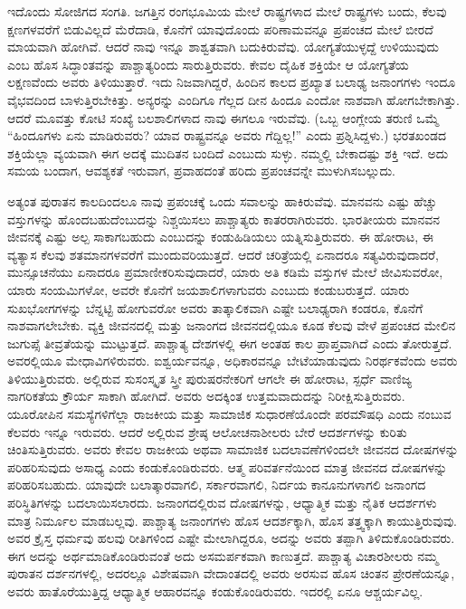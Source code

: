 ಇದೊಂದು ಸೋಜಿಗದ ಸಂಗತಿ. ಜಗತ್ತಿನ ರಂಗಭೂಮಿಯ ಮೇಲೆ ರಾಷ್ಟ್ರಗಳಾದ ಮೇಲೆ ರಾಷ್ಟ್ರಗಳು ಬಂದು, ಕೆಲವು ಕ್ಷಣಗಳವರೆಗೆ ಬಿಡುವಿಲ್ಲದೆ ಮೆರೆದಾಡಿ, ಕೊನೆಗೆ ಯಾವುದೊಂದು ಪರಿಣಾಮವನ್ನೂ ಪ್ರಪಂಚದ ಮೇಲೆ ಬೀರದೆ ಮಾಯವಾಗಿ ಹೋಗಿವೆ. ಆದರೆ ನಾವು ಇನ್ನೂ ಶಾಶ್ವತವಾಗಿ ಬದುಕಿರುವೆವು. ಯೋಗ್ಯತೆಯುಳ್ಳದ್ದೆ ಉಳಿಯುವುದು ಎಂಬ ಹೊಸ ಸಿದ್ಧಾಂತವನ್ನು ಪಾಶ್ಚಾತ್ಯರಿಂದು ಸಾರುತ್ತಿರುವರು. ಕೇವಲ ದೈಹಿಕ ಶಕ್ತಿಯೇ ಆ ಯೋಗ್ಯತೆಯ ಲಕ್ಷಣವೆಂದು ಅವರು ತಿಳಿಯುತ್ತಾರೆ. ಇದು ನಿಜವಾಗಿದ್ದರೆ, ಹಿಂದಿನ ಕಾಲದ ಪ್ರಖ್ಯಾತ ಬಲಾಢ್ಯ ಜನಾಂಗಗಳು ಇಂದೂ ವೈಭವದಿಂದ ಬಾಳುತ್ತಿರಬೇಕಿತ್ತು. ಅನ್ಯರನ್ನು ಎಂದಿಗೂ ಗೆಲ್ಲದ ದೀನ ಹಿಂದೂ ಎಂದೋ ನಾಶವಾಗಿ ಹೋಗಬೇಕಾಗಿತ್ತು. ಆದರೆ ಮೂವತ್ತು ಕೋಟಿ ಸಂಖ್ಯೆ ಬಲಶಾಲಿಗಳಾದ ನಾವು ಈಗಲೂ ಇರುವೆವು. (ಒಬ್ಬ ಆಂಗ್ಲೇಯ ತರುಣಿ ಒಮ್ಮೆ “ಹಿಂದೂಗಳು ಏನು ಮಾಡಿರುವರು? ಯಾವ ರಾಷ್ಟ್ರವನ್ನೂ ಅವರು ಗೆದ್ದಿಲ್ಲ!” ಎಂದು ಪ್ರಶ್ನಿಸಿದ್ದಳು.) ಭರತಖಂಡದ ಶಕ್ತಿಯೆಲ್ಲಾ ವ್ಯಯವಾಗಿ ಈಗ ಅದಕ್ಕೆ ಮುದಿತನ ಬಂದಿದೆ ಎಂಬುದು ಸುಳ್ಳು. ನಮ್ಮಲ್ಲಿ ಬೇಕಾದಷ್ಟು ಶಕ್ತಿ ಇದೆ. ಅದು ಸಮಯ ಬಂದಾಗ, ಆವಶ್ಯಕತೆ ಇರುವಾಗ, ಪ್ರವಾಹದಂತೆ ಹರಿದು ಪ್ರಪಂಚವನ್ನೇ ಮುಳುಗಿಸಬಲ್ಲುದು.

ಅತ್ಯಂತ ಪುರಾತನ ಕಾಲದಿಂದಲೂ ನಾವು ಪ್ರಪಂಚಕ್ಕೆ ಒಂದು ಸವಾಲನ್ನು ಹಾಕಿರುವೆವು. ಮಾನವನು ಎಷ್ಟು ಹೆಚ್ಚು ವಸ್ತುಗಳನ್ನು ಹೊಂದಬಹುದೆಂಬುದನ್ನು ನಿಶ್ಚಯಿಸಲು ಪಾಶ್ಚಾತ್ಯರು ಕಾತರರಾಗಿರುವರು. ಭಾರತೀಯರು ಮಾನವನ ಜೀವನಕ್ಕೆ ಎಷ್ಟು ಅಲ್ಪ ಸಾಕಾಗಬಹುದು ಎಂಬುದನ್ನು ಕಂಡುಹಿಡಿಯಲು ಯತ್ನಿಸುತ್ತಿರುವರು. ಈ ಹೋರಾಟ, ಈ ವ್ಯತ್ಯಾಸ ಕೆಲವು ಶತಮಾನಗಳವರೆಗೆ ಮುಂದುವರಿಯುತ್ತದೆ. ಆದರೆ ಚರಿತ್ರೆಯಲ್ಲಿ ಏನಾದರೂ ಸತ್ಯವಿರುವುದಾದರೆ, ಮುನ್ಸೂಚನೆಯು ಏನಾದರೂ ಪ್ರಮಾಣೀಕರಿಸುವುದಾದರೆ, ಯಾರು ಅತಿ ಕಡಿಮೆ ವಸ್ತುಗಳ ಮೇಲೆ ಜೀವಿಸುವರೋ, ಯಾರು ಸಂಯಮಿಗಳೋ, ಅವರೇ ಕೊನೆಗೆ ಜಯಶಾಲಿಗಳಾಗುವರು ಎಂಬುದು ಕಂಡುಬರುತ್ತದೆ. ಯಾರು ಸುಖಭೋಗಗಳನ್ನು ಬೆನ್ನಟ್ಟಿ ಹೋಗುವರೋ ಅವರು ತಾತ್ಕಾಲಿಕವಾಗಿ ಎಷ್ಟೇ ಬಲಾಢ್ಯರಾಗಿ ಕಂಡರೂ, ಕೊನೆಗೆ ನಾಶವಾಗಲೇಬೇಕು. ವ್ಯಕ್ತಿ ಜೀವನದಲ್ಲಿ ಮತ್ತು ಜನಾಂಗದ ಜೀವನದಲ್ಲಿಯೂ ಕೂಡ ಕೆಲವು ವೇಳೆ ಪ್ರಪಂಚದ ಮೇಲಿನ ಜುಗುಪ್ಸೆ ತೀವ್ರತೆಯನ್ನು ಮುಟ್ಟುತ್ತದೆ. ಪಾಶ್ಚಾತ್ಯ ದೇಶಗಳಲ್ಲಿ ಈಗ ಅಂತಹ ಕಾಲ ಪ್ರಾಪ್ತವಾಗಿದೆ ಎಂದು ತೋರುತ್ತದೆ. ಅವರಲ್ಲಿಯೂ ಮೇಧಾವಿಗಳಿರುವರು. ಐಶ್ವರ್ಯವನ್ನೂ, ಅಧಿಕಾರವನ್ನೂ ಬೇಟೆಯಾಡುವುದು ನಿರರ್ಥಕವೆಂದು ಅವರು ತಿಳಿಯುತ್ತಿರುವರು. ಅಲ್ಲಿರುವ ಸುಸಂಸ್ಕೃತ ಸ್ತ್ರೀ ಪುರುಷರನೇಕರಿಗೆ ಆಗಲೇ ಈ ಹೋರಾಟ, ಸ್ಪರ್ಧೆ ವಾಣಿಜ್ಯ ನಾಗರಿಕತೆಯ ಕ್ರೌರ್ಯ ಸಾಕಾಗಿ ಹೋಗಿದೆ. ಅವರು ಅದಕ್ಕಿಂತ ಉತ್ತಮವಾದುದನ್ನು ನಿರೀಕ್ಷಿಸುತ್ತಿರುವರು. ಯೂರೋಪಿನ ಸಮಸ್ಯೆಗಳಿಗೆಲ್ಲಾ ರಾಜಕೀಯ ಮತ್ತು ಸಾಮಾಜಿಕ ಸುಧಾರಣೆಯೊಂದೇ ಪರಮೌಷಧಿ ಎಂದು ನಂಬುವ ಕೆಲವರು ಇನ್ನೂ ಇರುವರು. ಆದರೆ ಅಲ್ಲಿರುವ ಶ್ರೇಷ್ಠ ಆಲೋಚನಾಶೀಲರು ಬೇರೆ ಆದರ್ಶಗಳನ್ನು ಕುರಿತು ಚಿಂತಿಸುತ್ತಿರುವರು. ಅವರು ಕೇವಲ ರಾಜಕೀಯ ಅಥವಾ ಸಾಮಾಜಿಕ ಬದಲಾವಣೆಗಳಿಂದಲೇ ಜೀವನದ ದೋಷಗಳನ್ನು ಪರಿಹರಿಸುವುದು ಅಸಾಧ್ಯ ಎಂದು ಕಂಡುಕೊಂಡಿರುವರು. ಆತ್ಮ ಪರಿವರ್ತನೆಯಿಂದ ಮಾತ್ರ ಜೀವನದ ದೋಷಗಳನ್ನು ಪರಿಹರಿಸಬಹುದು. ಯಾವುದೇ ಬಲಾತ್ಕಾರವಾಗಲಿ, ಸರ್ಕಾರವಾಗಲಿ, ನಿರ್ದಯ ಕಾನೂನುಗಳಾಗಲಿ ಜನಾಂಗದ ಪರಿಸ್ಥಿತಿಗಳನ್ನು ಬದಲಾಯಿಸಲಾರದು. ಜನಾಂಗದಲ್ಲಿರುವ ದೋಷಗಳನ್ನು, ಆಧ್ಯಾತ್ಮಿಕ ಮತ್ತು ನೈತಿಕ ಆದರ್ಶಗಳು ಮಾತ್ರ ನಿರ್ಮೂಲ ಮಾಡಬಲ್ಲವು. ಪಾಶ್ಚಾತ್ಯ ಜನಾಂಗಗಳು ಹೊಸ ಆದರ್ಶಕ್ಕಾಗಿ, ಹೊಸ ತತ್ತ್ವಕ್ಕಾಗಿ ಕಾಯುತ್ತಿರುವುವು. ಅವರ ಕ್ರೈಸ್ತ ಧರ್ಮವು ಹಲವು ರೀತಿಗಳಿಂದ ಎಷ್ಟೇ ಮೇಲಾಗಿದ್ದರೂ, ಅದನ್ನು ಅವರು ತಪ್ಪಾಗಿ ತಿಳಿದುಕೊಂಡಿರುವರು. ಈಗ ಅದನ್ನು ಅರ್ಥಮಾಡಿಕೊಂಡಿರುವಂತೆ ಅದು ಅಸಮರ್ಪಕವಾಗಿ ಕಾಣುತ್ತದೆ. ಪಾಶ್ಚಾತ್ಯ ವಿಚಾರಶೀಲರು ನಮ್ಮ ಪುರಾತನ ದರ್ಶನಗಳಲ್ಲಿ, ಅದರಲ್ಲೂ ವಿಶೇಷವಾಗಿ ವೇದಾಂತದಲ್ಲಿ ಅವರು ಅರಸುವ ಹೊಸ ಚಿಂತನ ಪ್ರೇರಣೆಯನ್ನೂ, ಅವರು ಹಾತೊರೆಯುತ್ತಿದ್ದ ಆಧ್ಯಾತ್ಮಿಕ ಆಹಾರವನ್ನೂ ಕಂಡುಕೊಂಡಿರುವರು. ಇದರಲ್ಲಿ ಏನೂ ಆಶ್ಚರ್ಯವಿಲ್ಲ.

